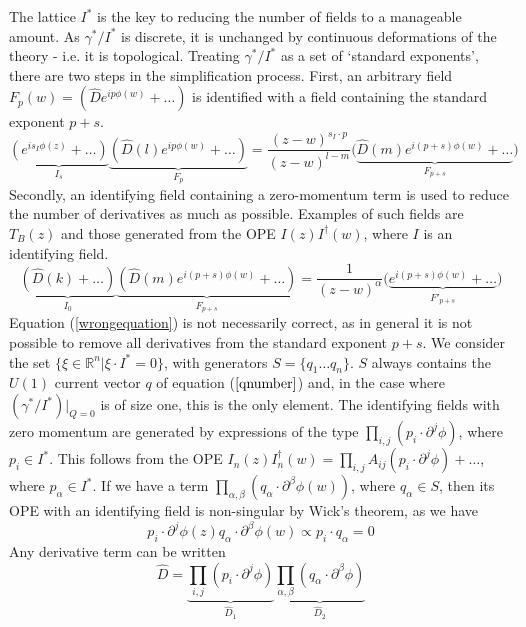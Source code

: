 \documentclass[a4paper,a4paper]{article}
\begin{document}
The lattice $I^{*}$ is the key to reducing the number of fields to a manageable amount. As $\gamma^* / I^*$ is discrete, it
is unchanged by continuous deformations of the theory - i.e. it is topological. Treating $\gamma^* / I^*$ as a set of 
`standard exponents', there are two steps in the simplification process.
First, an arbitrary field $F_p(w) = (\hat{D}e^{ip\phi(w)} + \ldots)$
is identified with a field containing the standard exponent $p+s$.
\begin{displaymath}
\underbrace{(e^{is_I\phi(z)} + \ldots )}_{I_s}\underbrace{(\hat{D}(l)e^{ip\phi(w)} + \ldots)}_{F_p} 
= \frac{(z-w)^{s_I \cdot p}}{(z-w)^{l-m}} \big(\underbrace{\hat{D}(m) e^{i(p+s)\phi(w)} + \ldots}_{F_{p+s}} \big)
\end{displaymath}
Secondly, an identifying field containing a zero-momentum term is used to reduce the number of
derivatives as much as possible. Examples of such fields are $T_B(z)$ and those generated from the OPE $I(z)I^{\dagger}(w)$,
where $I$ is an identifying field.
\begin{equation}
\label{wrongequation}
\underbrace{(\hat{D}(k) + \ldots )}_{I_0}\underbrace{(\hat{D}(m)e^{i(p+s)\phi(w)} + \ldots)}_{F_{p+s}} 
= \frac{1}{(z-w)^{\alpha}} \big(\underbrace{e^{i(p+s)\phi(w)} + \ldots}_{F'_{p+s}} \big) 
\end{equation}
Equation (\ref{wrongequation}) is not necessarily correct, as in general it is not possible to remove all derivatives from the standard exponent $p+s$.
We consider the set $\{ \xi \in \mathbb{R}^n | \xi \cdot I^* = 0\}$, with generators $S = \{q_1 \ldots q_n\}$. $S$ always
contains the $U(1)$ current vector $q$ of equation ($\ref{qnumber}$) and, in the case where $(\gamma^* / I^*)|_{Q=0}$ is of size one, this is the only element.
The identifying fields with zero momentum are generated by expressions of the type $\prod_{i,j} (p_i \cdot \partial^j \phi)$, where
$p_i \in I^*$. This follows from the OPE $I_n(z)I_n^{\dagger}(w) = \prod_{i, j} A_{ij} 
(p_{i}\cdot\partial^{j}\phi) + \ldots$, where $p_{\alpha} \in I^*$. 
If we have a term $\prod_{\alpha, \beta} (q_\alpha \cdot \partial^{\beta} \phi(w))$, where $q_{\alpha} \in S$, then its OPE
with an identifying field is non-singular by Wick's theorem, as we have
\begin{displaymath}
p_i \cdot \partial^j \phi(z) q_\alpha \cdot \partial^{\beta} \phi(w) \propto p_i \cdot q_{\alpha}  = 0
\end{displaymath}
Any derivative term can be written 
\begin{displaymath}
\hat{D} = \underbrace{\prod_{i,j} (p_i \cdot \partial^j \phi)}_{\hat{D}_1} \underbrace{\prod_{\alpha, \beta} (q_\alpha \cdot \partial^{\beta} \phi)}_{\hat{D}_2}
\end{displaymath}
\end{document}
